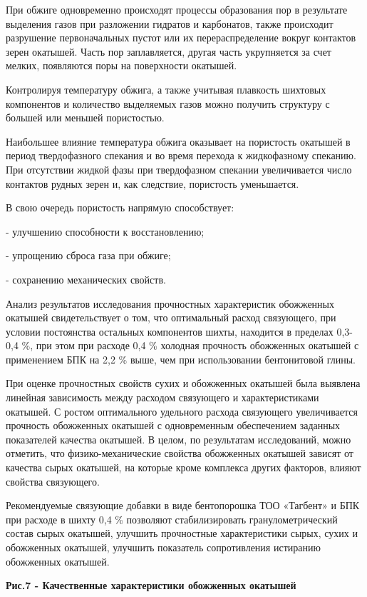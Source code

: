 При обжиге одновременно происходят процессы образования пор в результате
выделения газов при разложении гидратов и карбонатов, также происходит
разрушение первоначальных пустот или их перераспределение вокруг
контактов зерен окатышей. Часть пор заплавляется, другая часть
укрупняется за счет мелких, появляются поры на поверхности окатышей.

Контролируя температуру обжига, а также учитывая плавкость шихтовых
компонентов и количество выделяемых газов можно получить структуру с
большей или меньшей пористостью.

Наибольшее влияние температура обжига оказывает на пористость окатышей в
период твердофазного спекания и во время перехода к жидкофазному
спеканию. При отсутствии жидкой фазы при твердофазном спекании
увеличивается число контактов рудных зерен и, как следствие, пористость
уменьшается.

В свою очередь пористость напрямую способствует:

- улучшению способности к восстановлению;

- упрощению сброса газа при обжиге;

- сохранению механических свойств.

Анализ результатов исследования прочностных характеристик обожженных
окатышей свидетельствует о том, что оптимальный расход связующего, при
условии постоянства остальных компонентов шихты, находится в пределах
0,3-0,4 \%, при этом при расходе 0,4 \% холодная прочность обожженных
окатышей с применением БПК на 2,2 \% выше, чем при использовании
бентонитовой глины.

При оценке прочностных свойств сухих и обожженных окатышей была выявлена
линейная зависимость между расходом связующего и характеристиками
окатышей. С ростом оптимального удельного расхода связующего
увеличивается прочность обожженных окатышей с одновременным обеспечением
заданных показателей качества окатышей. В целом, по результатам
исследований, можно отметить, что физико-механические свойства
обожженных окатышей зависят от качества сырых окатышей, на которые кроме
комплекса других факторов, влияют свойства связующего.

Рекомендуемые связующие добавки в виде бентопорошка ТОО «Тагбент» и БПК
при расходе в шихту 0,4 \% позволяют стабилизировать гранулометрический
состав сырых окатышей, улучшить прочностные характеристики сырых, сухих
и обожженных окатышей, улучшить показатель сопротивления истиранию
обожженных окатышей.

{\bfseries Рис.7 - Качественные характеристики обожженных окатышей}

